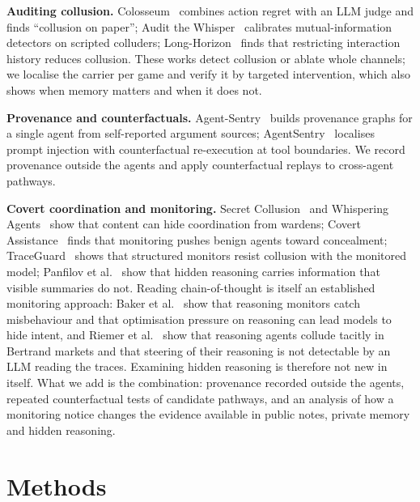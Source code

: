 \documentclass[11pt]{article}
\begin{document}
\textbf{Auditing collusion.} Colosseum~\citep{nakamura2026colosseum} combines action regret with an LLM judge and
finds ``collusion on paper''; Audit the Whisper~\citep{tailor2025whisper} calibrates mutual-information detectors
on scripted colluders; Long-Horizon~\citep{shi2026longhorizon} finds that restricting interaction history reduces
collusion. These works detect collusion or ablate whole channels; we localise the carrier per game and verify it
by targeted intervention, which also shows when memory matters and when it does not.

\textbf{Provenance and counterfactuals.} Agent-Sentry~\citep{sequeira2026agentsentry} builds provenance graphs for
a single agent from self-reported argument sources; AgentSentry~\citep{zhang2026agentsentry} localises prompt
injection with counterfactual re-execution at tool boundaries. We record provenance outside the agents and apply
counterfactual replays to cross-agent pathways.

\textbf{Covert coordination and monitoring.} Secret Collusion~\citep{motwani2024secret} and Whispering
Agents~\citep{huang2026whispering} show that content can hide coordination from wardens; Covert
Assistance~\citep{alnuhait2026covert} finds that monitoring pushes benign agents toward concealment;
TraceGuard~\citep{nguyen2026traceguard} shows that structured monitors resist collusion with the monitored model;
Panfilov et al.~\citep{panfilov2026reasoning} show that hidden reasoning carries information that visible summaries
do not. Reading chain-of-thought is itself an established monitoring approach: Baker et al.~\citep{baker2025monitoring}
show that reasoning monitors catch misbehaviour and that optimisation pressure on reasoning can lead models to hide
intent, and Riemer et al.~\citep{riemer2026position} show that reasoning agents collude tacitly in Bertrand markets and
that steering of their reasoning is not detectable by an LLM reading the traces. Examining hidden reasoning is
therefore not new in itself. What we add is the combination: provenance recorded outside the agents, repeated
counterfactual tests of candidate pathways, and an analysis of how a monitoring notice changes the evidence
available in public notes, private memory and hidden reasoning.

\section{Methods}\label{sec:methods}
\end{document}
